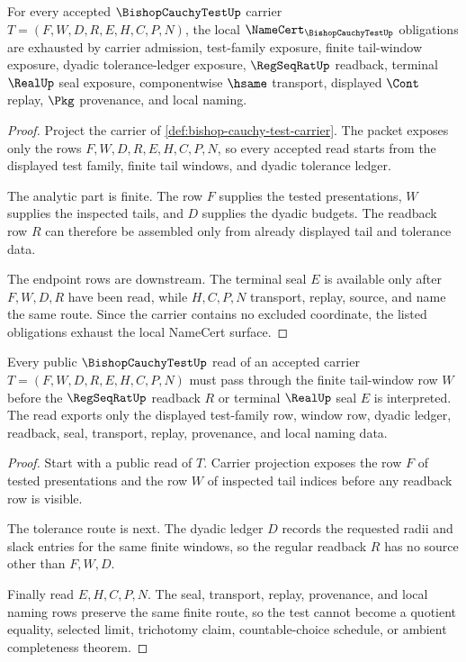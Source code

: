 \begin{theorem}
\label{thm:bishop-cauchy-test-namecert-obligations}
For every accepted $\BishopCauchyTestUp$ carrier $T=(F,W,D,R,E,H,C,P,N)$, the local $\NameCert_{\BishopCauchyTestUp}$ obligations are exhausted by carrier admission, test-family exposure, finite tail-window exposure, dyadic tolerance-ledger exposure, $\RegSeqRatUp$ readback, terminal $\RealUp$ seal exposure, componentwise $\hsame$ transport, displayed $\Cont$ replay, $\Pkg$ provenance, and local naming.
\end{theorem}
\begin{proof}
Project the carrier of \autoref{def:bishop-cauchy-test-carrier}. The packet exposes only the rows $F,W,D,R,E,H,C,P,N$, so every accepted read starts from the displayed test family, finite tail windows, and dyadic tolerance ledger.

The analytic part is finite. The row $F$ supplies the tested presentations, $W$ supplies the inspected tails, and $D$ supplies the dyadic budgets. The readback row $R$ can therefore be assembled only from already displayed tail and tolerance data.

The endpoint rows are downstream. The terminal seal $E$ is available only after $F,W,D,R$ have been read, while $H,C,P,N$ transport, replay, source, and name the same route. Since the carrier contains no excluded coordinate, the listed obligations exhaust the local NameCert surface.
\end{proof}

\begin{theorem}
\label{thm:bishop-cauchy-test-finite-tail-window}
Every public $\BishopCauchyTestUp$ read of an accepted carrier $T=(F,W,D,R,E,H,C,P,N)$ must pass through the finite tail-window row $W$ before the $\RegSeqRatUp$ readback $R$ or terminal $\RealUp$ seal $E$ is interpreted. The read exports only the displayed test-family row, window row, dyadic ledger, readback, seal, transport, replay, provenance, and local naming data.
\end{theorem}
\begin{proof}
Start with a public read of $T$. Carrier projection exposes the row $F$ of tested presentations and the row $W$ of inspected tail indices before any readback row is visible.

The tolerance route is next. The dyadic ledger $D$ records the requested radii and slack entries for the same finite windows, so the regular readback $R$ has no source other than $F,W,D$.

Finally read $E,H,C,P,N$. The seal, transport, replay, provenance, and local naming rows preserve the same finite route, so the test cannot become a quotient equality, selected limit, trichotomy claim, countable-choice schedule, or ambient completeness theorem.
\end{proof}

